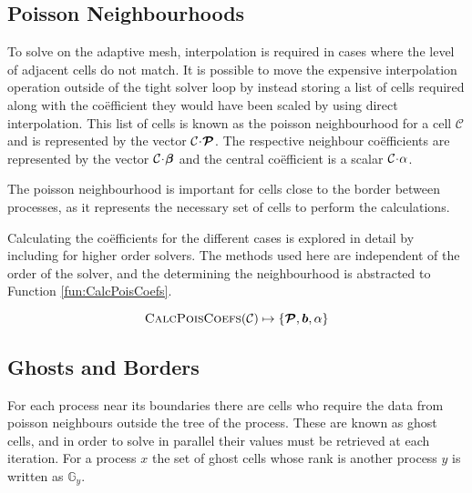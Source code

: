 \documentclass{IIBproject}
\newcommand{\vect} [1] {\bm{#1}}
\newcommand{\acc}{{\mkern 0.5mu\cdot\mkern 0.5mu}}
\numberwithin{figure}{section}
\begin{document}


    \subsection{Poisson Neighbourhoods} %
        \label{sec:poissonneighbours}

        To solve on the adaptive mesh, interpolation is required in cases where the level of adjacent cells do not match. It is possible to move the expensive interpolation operation outside of the tight solver loop by instead storing a list of cells required along with the co\"efficient they would have been scaled by using direct interpolation. This list of cells is known as the poisson neighbourhood for a cell $\mathcal{C}$ and is represented by the vector $\mathcal{C}\acc\vect{\mathcal{P}}$. The respective neighbour co\"efficients are represented by the vector $\mathcal{C}\acc\vect{\beta}$ and the central co\"efficient is a scalar $\mathcal{C}\acc\alpha$.

        The poisson neighbourhood is important for cells close to the border between processes, as it represents the necessary set of cells to perform the calculations.

        Calculating the co\"efficients for the different cases is explored in detail by \cite{Yung2010} including for higher order solvers. The methods used here are independent of the order of the solver, and the determining the neighbourhood is abstracted to Function \ref{fun:CalcPoisCoefs}.

        \begin{equation}
            \label{fun:CalcPoisCoefs}
            \textproc{CalcPoisCoefs}(\mathcal{C}) \mapsto \{ \vect{\mathcal{P}}, \vect{b}, \alpha \}
        \end{equation}



    \subsection{Ghosts and Borders} %
        \label{sec:ghostsandborders}

        For each process near its boundaries there are cells who require the data from poisson neighbours outside the tree of the process. These are known as ghost cells, and in order to solve in parallel their values must be retrieved at each iteration. For a process $x$ the set of ghost cells whose rank is another process $y$ is written as $\mathbb{G}_y$.
\end{document}

